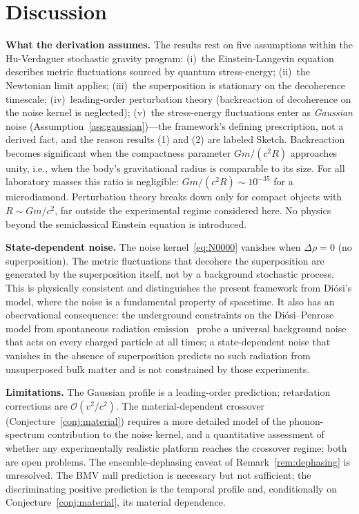 \documentclass[12pt,a4paper]{article}
\theoremstyle{remark}
\begin{document}
\section{Discussion}
\label{sec:discussion}

\textbf{What the derivation assumes.} The results rest on five assumptions within
the Hu-Verdaguer stochastic gravity program: (i)~the Einstein-Langevin equation describes
metric fluctuations sourced by quantum stress-energy; (ii)~the Newtonian limit applies;
(iii)~the superposition is stationary on the decoherence timescale; (iv)~leading-order
perturbation theory (backreaction of decoherence on the noise kernel is neglected);
(v)~the stress-energy fluctuations enter as \emph{Gaussian} noise
(Assumption~\ref{ass:gaussian})---the framework's defining prescription, not a derived
fact, and the reason results (1) and (2) are labeled Sketch.
Backreaction becomes significant when the compactness parameter $Gm/(c^2 R)$ approaches
unity, i.e., when the body's gravitational radius is comparable to its size. For all
laboratory masses this ratio is negligible: $Gm/(c^2 R) \sim 10^{-35}$ for a
microdiamond. Perturbation theory breaks down only for compact objects with
$R \sim Gm/c^2$, far outside the experimental regime considered here.
No physics beyond the semiclassical Einstein equation is introduced.

\textbf{State-dependent noise.} The noise kernel~\eqref{eq:N0000} vanishes when
$\Delta\rho = 0$ (no superposition). The metric fluctuations that decohere the
superposition are generated by the superposition itself, not by a background stochastic
process. This is physically consistent and distinguishes the present framework
from Di\'osi's model, where the noise is a fundamental property of spacetime. It also has
an observational consequence: the underground constraints on the Di\'osi--Penrose model
from spontaneous radiation emission~\cite{donadi} probe a universal background noise that
acts on every charged particle at all times; a state-dependent noise that vanishes in the
absence of superposition predicts no such radiation from unsuperposed bulk matter and is
not constrained by those experiments.

\textbf{Limitations.} The Gaussian profile is a leading-order prediction; retardation
corrections are $\mathcal{O}(v^2/c^2)$. The material-dependent crossover
(Conjecture~\ref{conj:material}) requires a more detailed model of the phonon-spectrum
contribution to the noise kernel, and a quantitative assessment of whether any
experimentally realistic platform reaches the crossover regime; both are open problems.
The ensemble-dephasing caveat of Remark~\ref{rem:dephasing} is unresolved. The BMV null
prediction is necessary but not sufficient; the discriminating positive prediction is the
temporal profile and, conditionally on Conjecture~\ref{conj:material}, its material
dependence.
\end{document}
